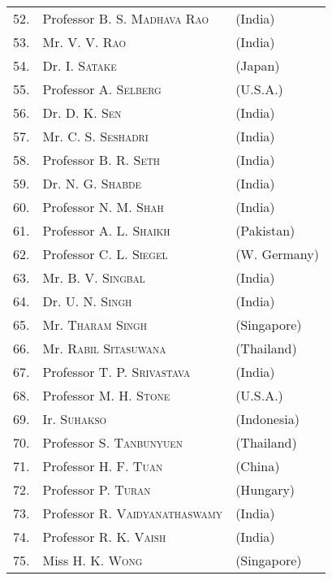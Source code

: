 \begin{longtable}[l]{r@{\;\,}ll}
52. & Professor \textsc{B. S. Madhava Rao} & (India)\\
53. & Mr. \textsc{V. V. Rao} & (India)\\
54. & Dr. \textsc{I. Satake} & (Japan)\\
55. & Professor \textsc{A. Selberg} & (U.S.A.)\\
56. & Dr. \textsc{D. K. Sen} & (India)\\
57. & Mr. \textsc{C. S. Seshadri} & (India)\\
58. & Professor \textsc{B. R. Seth} & (India)\\
59. & Dr. \textsc{N. G. Shabde} & (India)\\
60. & Professor \textsc{N. M. Shah} & (India)\\
61. & Professor \textsc{A. L. Shaikh} & (Pakistan)\\
62. & Professor \textsc{C. L. Siegel} & (W. Germany)\\
63. & Mr. \textsc{B. V. Singbal} & (India)\\
64. & Dr. \textsc{U. N. Singh} & (India)\\
65. & Mr. \textsc{Tharam Singh} & (Singapore)\\
66. & Mr. \textsc{Rabil Sitasuwana} & (Thailand)\\
67. & Professor \textsc{T. P. Srivastava} & (India)\\
68. & Professor \textsc{M. H. Stone} & (U.S.A.)\\
69. & Ir. \textsc{Suhakso} & (Indonesia)\\
70. & Professor \textsc{S. Tanbunyuen} & (Thailand)\\
71. & Professor \textsc{H. F. Tuan} & (China)\\
72. & Professor \textsc{P. Turan} & (Hungary)\\
73. & Professor \textsc{R. Vaidyanathaswamy} & (India)\\
74. & Professor \textsc{R. K. Vaish} & (India)\\
75. & Miss \textsc{H. K. Wong} & (Singapore)\\
\end{longtable}
